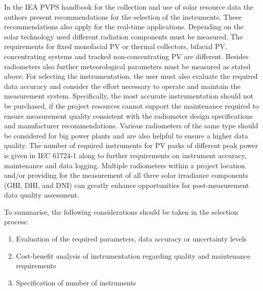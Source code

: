 In the IEA PVPS handbook for the collection and use of solar resource data \cite{nrelhandbook2021} the authors present recommendations for the selection of the instruments. These recommendations also apply for the real-time applications. Depending on the solar technology used different radiation components must be measured. The requirements for fixed monofacial PV or thermal collectors, bifacial PV, concentrating systems and tracked non-concentrating PV are different. Besides radiometers also further meteorological parameters must be measured as stated above. For selecting the instrumentation, the user must also evaluate the required data accuracy and consider the effort necessary to operate and maintain the measurement system. Specifically, the most accurate instrumentation should not be purchased, if the project resources cannot support the maintenance required to ensure measurement quality consistent with the radiometer design specifications and manufacturer recommendations. 
Various radiometers of the same type should be considered for big power plants and are also helpful to ensure a higher data quality. The number of required instruments for PV parks of different peak power is given in IEC 61724-1 along to further requirements on instrument accuracy, maintenance and data logging. Multiple radiometers within a project location and/or providing for the measurement of all three solar irradiance components (GHI, DHI, and DNI) can greatly enhance opportunities for post-measurement data quality assessment.

To summarise, the following considerations should be taken in the selection process:

\begin{enumerate}
    \item Evaluation of the required parameters, data accuracy or uncertainty levels
    \item Cost-benefit analysis of instrumentation regarding quality and maintenance requirements
    \item Specification of number of instruments
\end{enumerate}
   

